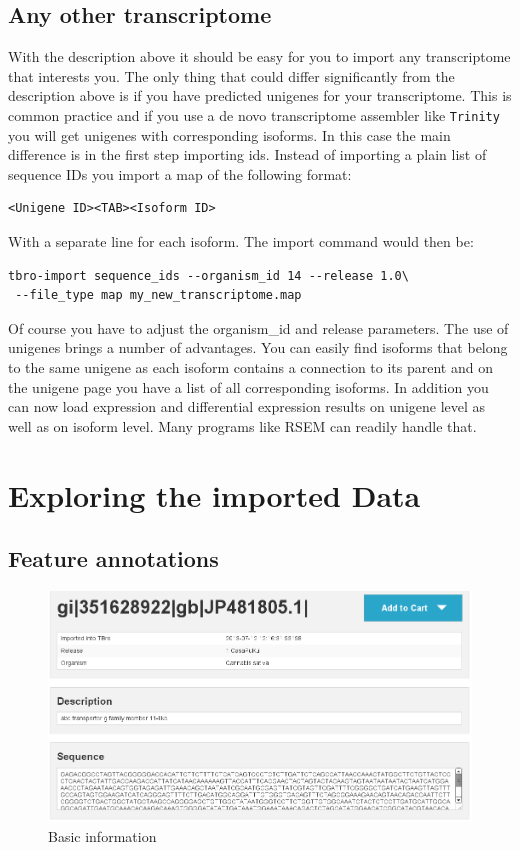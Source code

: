 \documentclass[english]{scrartcl}
\begin{document}
\subsection{Any other transcriptome}
With the description above it should be easy for you to import any transcriptome
that interests you. The only thing that could differ significantly from the
description above is if you have predicted unigenes for your transcriptome. This
is common practice and if you use a de novo transcriptome assembler like
\texttt{Trinity} you will get unigenes with corresponding isoforms. In this case
the main difference is in the first step importing ids. Instead of importing a
plain list of sequence IDs you import a map of the following format:
\begin{lstlisting}
<Unigene ID><TAB><Isoform ID>
\end{lstlisting}
With a separate line for each isoform. The import command would then be:
\begin{lstlisting}
tbro-import sequence_ids --organism_id 14 --release 1.0\
 --file_type map my_new_transcriptome.map
\end{lstlisting} 
Of course you have to adjust the organism\_id and release parameters. The use of
unigenes brings a number of advantages. You can easily find isoforms that belong
to the same unigene as each isoform contains a connection to its parent and on
the unigene page you have a list of all corresponding isoforms. In addition you
can now load expression and differential expression results on unigene level as
well as on isoform level. Many programs like RSEM can readily handle that.

\section{Exploring the imported Data}
\subsection{Feature annotations}
\begin{figure}
\begin{center}
  \includegraphics[width=\textwidth]{figures/basic_info.png}
  \caption{Basic information}
  \label{fig:basic}
\end{center}
\end{figure}
\end{document}
